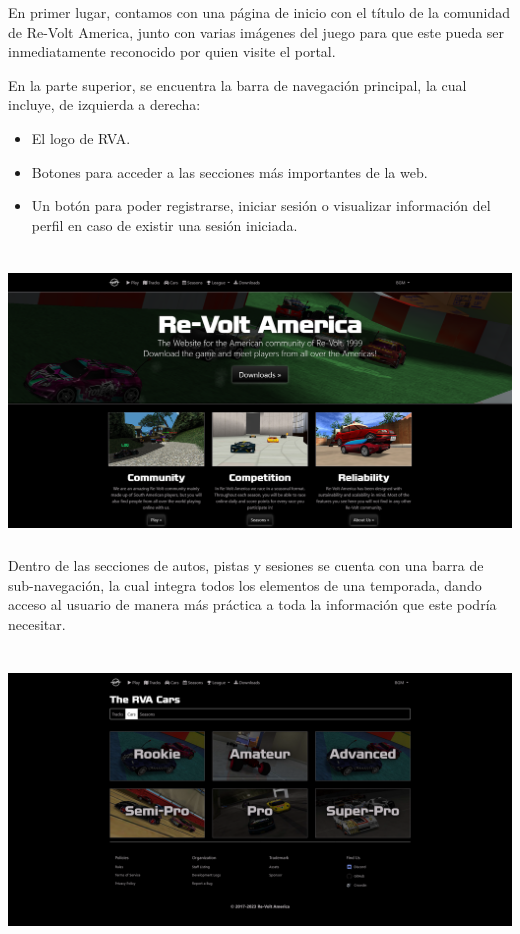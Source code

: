 En primer lugar, contamos con una página de inicio con el título de la comunidad de Re-Volt America, junto con varias imágenes del juego para que este pueda ser inmediatamente reconocido por quien visite el portal.

En la parte superior, se encuentra la barra de navegación principal, la cual incluye, de izquierda a derecha:
\begin{itemize}
  \item El logo de RVA.
  \item Botones para acceder a las secciones más importantes de la web.
  \item Un botón para poder registrarse, iniciar sesión o visualizar información del perfil en caso de existir una sesión iniciada.
\end{itemize}

\includegraphics[width=15cm, height=8cm]{img/landing.png} \\

Dentro de las secciones de autos, pistas y sesiones se cuenta con una barra de sub-navegación, la cual integra todos los elementos de una temporada, dando acceso al usuario de manera más práctica a toda la información que este podría necesitar.

\includegraphics[width=15cm, height=8cm]{img/cars.png} \\

